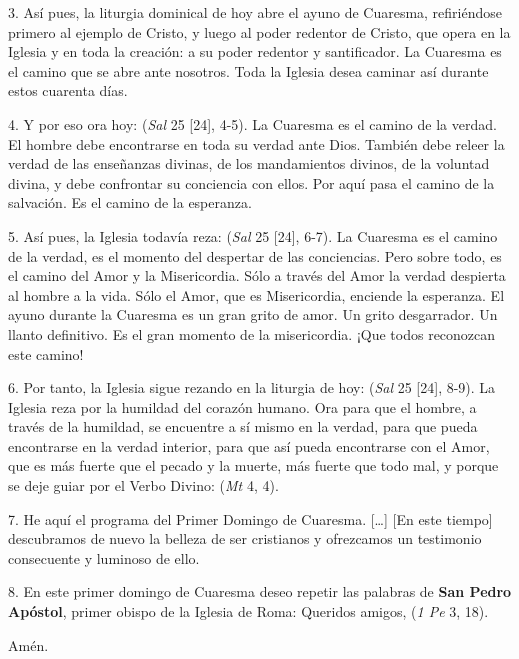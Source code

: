 \begin{body}
3. Así pues, la liturgia dominical de hoy abre el ayuno de Cuaresma, refiriéndose primero al ejemplo de Cristo, y luego al poder redentor de Cristo, que opera en la Iglesia y en toda la creación: a su poder redentor y santificador. La Cuaresma es el camino que se abre ante nosotros. Toda la Iglesia desea caminar así durante estos cuarenta días.

4. Y por eso ora hoy:  (\textit{Sal} 25 [24], 4-5). La Cuaresma es el camino de la verdad. El hombre debe encontrarse en toda su verdad ante Dios. También debe releer la verdad de las enseñanzas divinas, de los mandamientos divinos, de la voluntad divina, y debe confrontar su conciencia con ellos. Por aquí pasa el camino de la salvación. Es el camino de la esperanza.

5. Así pues, la Iglesia todavía reza:  (\textit{Sal} 25 [24], 6-7). La Cuaresma es el camino de la verdad, es el momento del despertar de las conciencias. Pero sobre todo, es el camino del Amor y la Misericordia. Sólo a través del Amor la verdad despierta al hombre a la vida. Sólo el Amor, que es Misericordia, enciende la esperanza. El ayuno durante la Cuaresma es un gran grito de amor. Un grito desgarrador. Un llanto definitivo. Es el gran momento de la misericordia. ¡Que todos reconozcan este camino!

6. Por tanto, la Iglesia sigue rezando en la liturgia de hoy:  (\textit{Sal} 25 [24], 8-9). La Iglesia reza por la humildad del corazón humano. Ora para que el hombre, a través de la humildad, se encuentre a sí mismo en la verdad, para que pueda encontrarse en la verdad interior, para que así pueda encontrarse con el Amor, que es más fuerte que el pecado y la muerte, más fuerte que todo mal, y porque se deje guiar por el Verbo Divino:  (\textit{Mt} 4, 4).

7. He aquí el programa del Primer Domingo de Cuaresma. [\ldots] [En este tiempo] descubramos de nuevo la belleza de ser cristianos y ofrezcamos un testimonio consecuente y luminoso de ello.

8. En este primer domingo de Cuaresma deseo repetir las palabras de \textbf{San Pedro Apóstol}, primer obispo de la Iglesia de Roma: Queridos amigos,  (\textit{1 Pe} 3, 18).

Amén.
\end{body}

